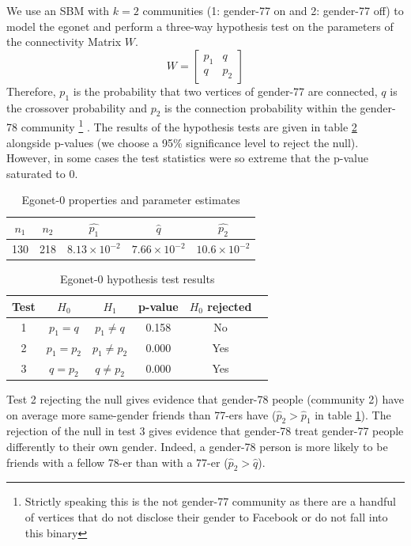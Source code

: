 \documentclass[11pt]{article}
\begin{document}
\begin{multicols*}{2}
We use an SBM with $k=2$ communities (1: gender-77 on and 2: gender-77 off) to model the egonet and perform a three-way hypothesis test on the parameters of the connectivity Matrix $W$.
%
\begin{equation}
	W = \begin{bmatrix}
		p_1 & q \\
		q & p_2
	\end{bmatrix}
\end{equation}
%
Therefore, $p_1$ is the probability that two vertices of gender-77 are connected, $q$ is the crossover probability and $p_2$ is the connection probability within the gender-78 community
\footnote{Strictly speaking this is the not gender-77 community as there are a handful of vertices that do not disclose their gender to Facebook or do not fall into this binary}
. The results of the hypothesis tests are given in table \ref{tab:egonet-0-hyp-tests} alongside p-values (we choose a 95\% significance level to reject the null). However, in some cases the test statistics were so extreme that the p-value saturated to 0.
%
\begin{table}[H]
	\centering
	\begin{tabular}{c c c c c}
		$n_1$                & $n_2$                & $\hat{p_1}$ & $\hat{q}$ & $\hat{p_2}$       \\ \hline
		130 & 218 & $8.13 \times 10^{-2}$ & $7.66 \times 10^{-2}$ & $10.6 \times 10^{-2}$
	\end{tabular}
	\caption{Egonet-0 properties and parameter estimates}
	\label{tab:egonet-0-props}
\end{table}
%
\begin{table}[H]
	\centering
	\begin{tabular}{cccccc}
		Test & $H_0$                & $H_1$                & p-value & $H_0$ rejected       \\ \hline
		1    & $p_1 = q$            & $p_1 \neq q$         & 0.158 &  No                \\
		2    & $p_1 = p_2$ & $p_1 \neq p_2$ & 0.000 & Yes \\
		3    & $q = p_2$ & $q \neq p_2$ &  0.000 & Yes
	\end{tabular}
	\caption{Egonet-0 hypothesis test results}
	\label{tab:egonet-0-hyp-tests}
\end{table}

Test 2 rejecting the null gives evidence that gender-78 people (community 2) have on average more same-gender friends than 77-ers have ($\hat{p}_2 > \hat{p}_1$ in table \ref{tab:egonet-0-props}). The rejection of the null in test 3 gives evidence that gender-78 treat gender-77 people differently to their own gender. Indeed, a gender-78 person is more likely to be friends with a fellow 78-er than with a 77-er ($\hat{p}_2 > \hat{q}$).


\end{multicols*}
\end{document}
